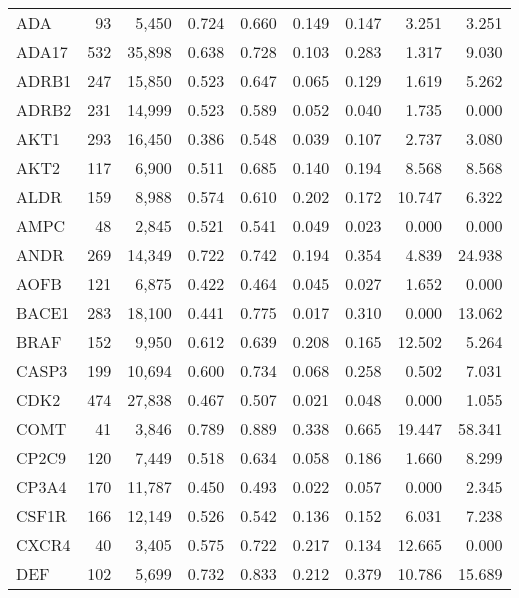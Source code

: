 \begin{center}
\begin{footnotesize}
\begin{longtable}{lrrrrrrrr}
			ADA    & 93    & 5,450    & 0.724   & 0.660   & 0.149   & 0.147   & 3.251   & 3.251  \\
			ADA17  & 532   & 35,898   & 0.638   & 0.728   & 0.103   & 0.283   & 1.317   & 9.030  \\
			ADRB1  & 247   & 15,850   & 0.523   & 0.647   & 0.065   & 0.129   & 1.619   & 5.262  \\
			ADRB2  & 231   & 14,999   & 0.523   & 0.589   & 0.052   & 0.040   & 1.735   & 0.000  \\
			AKT1   & 293   & 16,450   & 0.386   & 0.548   & 0.039   & 0.107   & 2.737   & 3.080  \\
			AKT2   & 117   & 6,900    & 0.511   & 0.685   & 0.140   & 0.194   & 8.568   & 8.568  \\
			ALDR   & 159   & 8,988    & 0.574   & 0.610   & 0.202   & 0.172   & 10.747  & 6.322  \\
			AMPC   & 48    & 2,845    & 0.521   & 0.541   & 0.049   & 0.023   & 0.000   & 0.000  \\
			ANDR   & 269   & 14,349   & 0.722   & 0.742   & 0.194   & 0.354   & 4.839   & 24.938 \\
			AOFB   & 121   & 6,875    & 0.422   & 0.464   & 0.045   & 0.027   & 1.652   & 0.000  \\
			BACE1  & 283   & 18,100   & 0.441   & 0.775   & 0.017   & 0.310   & 0.000   & 13.062 \\
			BRAF   & 152   & 9,950    & 0.612   & 0.639   & 0.208   & 0.165   & 12.502  & 5.264  \\
			CASP3  & 199   & 10,694   & 0.600   & 0.734   & 0.068   & 0.258   & 0.502   & 7.031  \\
			CDK2   & 474   & 27,838   & 0.467   & 0.507   & 0.021   & 0.048   & 0.000   & 1.055  \\
			COMT   & 41    & 3,846    & 0.789   & 0.889   & 0.338   & 0.665   & 19.447  & 58.341 \\
			CP2C9  & 120   & 7,449    & 0.518   & 0.634   & 0.058   & 0.186   & 1.660   & 8.299  \\
			CP3A4  & 170   & 11,787   & 0.450   & 0.493   & 0.022   & 0.057   & 0.000   & 2.345  \\
			CSF1R  & 166   & 12,149   & 0.526   & 0.542   & 0.136   & 0.152   & 6.031   & 7.238  \\
			CXCR4  & 40    & 3,405    & 0.575   & 0.722   & 0.217   & 0.134   & 12.665  & 0.000  \\
			DEF    & 102   & 5,699    & 0.732   & 0.833   & 0.212   & 0.379   & 10.786  & 15.689 \\

\end{longtable}
\end{footnotesize}
\end{center}
